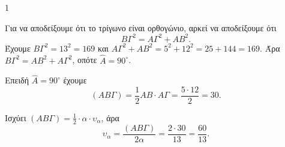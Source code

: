 \begin{ylh}{1}
    \item[ΛΥΣΗ]
    \begin{alist}
        \item Για να αποδείξουμε ότι το τρίγωνο είναι ορθογώνιο, αρκεί να αποδείξουμε ότι
        \[
            ΒΓ^2 = ΑΓ^2 + ΑΒ^2.
        \]
        Έχουμε $ΒΓ^2 = 13^2 = 169$ και $ΑΓ^2 + ΑΒ^2 = 5^2 + 12^2 = 25 + 144 = 169$. Άρα $ΒΓ^2 = ΑΒ^2 + ΑΓ^2$, οπότε $\hat{A} = 90^\circ$.
        
        \item Επειδή $\hat{A} = 90^\circ$ έχουμε
        \[
            (ΑΒΓ) = \frac{1}{2}ΑΒ \cdot ΑΓ = \frac{5 \cdot 12}{2} = 30.
        \]
        
        \item Ισχύει $(ΑΒΓ) = \frac{1}{2} \cdot α \cdot υ_α$, άρα
        \[
            υ_α = \frac{(ΑΒΓ)}{2α} = \frac{2 \cdot 30}{13} = \frac{60}{13}.
        \]
    \end{alist}
\end{ylh}